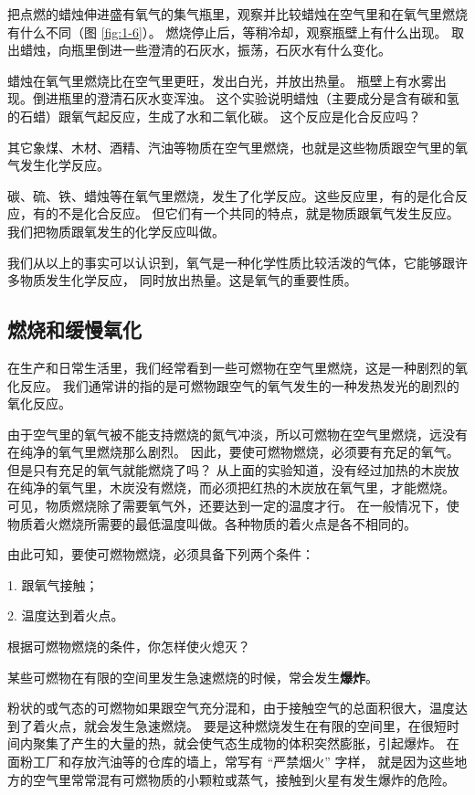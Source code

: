 \wrapfiguretrick


\begin{shiyan}
    把点燃的蜡烛伸进盛有氧气的集气瓶里，观察并比较蜡烛在空气里和在氧气里燃烧有什么不同（图 \ref{fig:1-6}）。
    燃烧停止后，等稍冷却，观察瓶壁上有什么出现。
    取出蜡烛，向瓶里倒进一些澄清的石灰水，振荡，石灰水有什么变化。

\end{shiyan}

蜡烛在氧气里燃烧比在空气里更旺，发出白光，并放出热量。
瓶壁上有水雾出现。倒进瓶里的澄清石灰水变浑浊。
这个实验说明蜡烛（主要成分是含有碳和氢的石蜡）跟氧气起反应，生成了水和二氧化碳。
这个反应是化合反应吗？

其它象煤、木材、酒精、汽油等物质在空气里燃烧，也就是这些物质跟空气里的氧气发生化学反应。

碳、硫、铁、蜡烛等在氧气里燃烧，发生了化学反应。这些反应里，有的是化合反应，有的不是化合反应。
但它们有一个共同的特点，就是物质跟氧气发生反应。我们把物质跟氧发生的化学反应叫做。

我们从以上的事实可以认识到，氧气是一种化学性质比较活泼的气体，它能够跟许多物质发生化学反应，
同时放出热量。这是氧气的重要性质。


\subsection{燃烧和缓慢氧化}

在生产和日常生活里，我们经常看到一些可燃物在空气里燃烧，这是一种剧烈的氧化反应。
我们通常讲的指的是可燃物跟空气的氧气发生的一种发热发光的剧烈的氧化反应。

由于空气里的氧气被不能支持燃烧的氮气冲淡，所以可燃物在空气里燃烧，远没有在纯净的氧气里燃烧那么剧烈。
因此，要使可燃物燃烧，必须要有充足的氧气。但是只有充足的氧气就能燃烧了吗？
从上面的实验知道，没有经过加热的木炭放在纯净的氧气里，木炭没有燃烧，而必须把红热的木炭放在氧气里，才能燃烧。
可见，物质燃烧除了需要氧气外，还要达到一定的温度才行。
在一般情况下，使物质着火燃烧所需要的最低温度叫做。各种物质的着火点是各不相同的。


由此可知，要使可燃物燃烧，必须具备下列两个条件：

1. 跟氧气接触；

2. 温度达到着火点。

\taolun 根据可燃物燃烧的条件，你怎样使火熄灭？

某些可燃物在有限的空间里发生急速燃烧的时候，常会发生\textbf{爆炸}。

\begin{yuedu}

    粉状的或气态的可燃物如果跟空气充分混和，由于接触空气的总面积很大，温度达到了着火点，就会发生急速燃烧。
    要是这种燃烧发生在有限的空间里，在很短时间内聚集了产生的大量的热，就会使气态生成物的体积突然膨胀，引起爆炸。
    在面粉工厂和存放汽油等的仓库的墙上，常写有 “严禁烟火” 字样，
    就是因为这些地方的空气里常常混有可燃物质的小颗粒或蒸气，接触到火星有发生爆炸的危险。

\end{yuedu}

